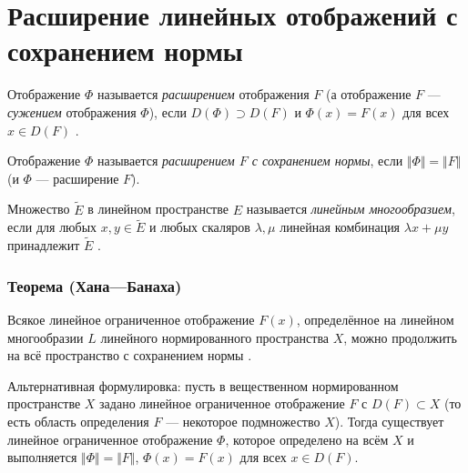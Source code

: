 \section{Расширение линейных отображений с сохранением нормы}

Отображение $\Phi$ называется \textit{расширением} отображения $F$ (а отображение $F$ --- \textit{сужением} отображения $\Phi$), если $D(\Phi) \supset D(F)$ и $\Phi(x) = F(x)$ для всех $x \in D(F)$ \cite[с.~109]{trenogin}.

Отображение $\Phi$ называется \textit{расширением $F$ с сохранением нормы}, если $\Vert \Phi \Vert = \Vert F \Vert$ (и $\Phi$ --- расширение $F$).

Множество $\widetilde{E}$ в линейном пространстве $E$ называется \textit{линейным многообразием}, если для любых $x, y \in \widetilde{E}$ и любых скаляров $\lambda, \mu$ линейная комбинация $\lambda x + \mu y$ принадлежит $\widetilde{E}$ \cite[с.~13]{trenogin}.

\subsubsection*{Теорема (Хана---Банаха)}
Всякое линейное ограниченное отображение $F(x)$, определённое на линейном многообразии $L$ линейного нормированного пространства $X$, можно продолжить на всё пространство с сохранением нормы \cite[с.~163]{trenogin}.

Альтернативная формулировка: пусть в вещественном нормированном пространстве $X$ задано линейное ограниченное отображение $F$ с $D(F) \subset X$ (то есть область определения $F$ --- некоторое подмножество $X$). Тогда существует линейное ограниченное отображение $\Phi$, которое определено на всём $X$ и выполняется $\Vert \Phi \Vert = \Vert F \Vert$, $\Phi(x) = F(x)$ для всех $x \in D(F)$.
